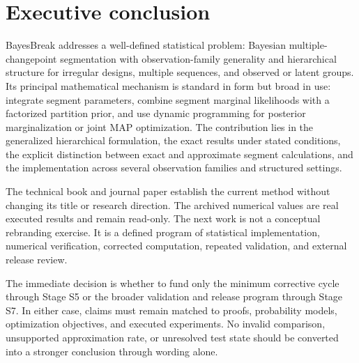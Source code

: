 \section{Executive conclusion}
\label{sec:exec-conclusion}

BayesBreak addresses a well-defined statistical problem: Bayesian multiple-changepoint segmentation with observation-family generality and hierarchical structure for irregular designs, multiple sequences, and observed or latent groups. Its principal mathematical mechanism is standard in form but broad in use: integrate segment parameters, combine segment marginal likelihoods with a factorized partition prior, and use dynamic programming for posterior marginalization or joint MAP optimization. The contribution lies in the generalized hierarchical formulation, the exact results under stated conditions, the explicit distinction between exact and approximate segment calculations, and the implementation across several observation families and structured settings.

The technical book and journal paper establish the current method without changing its title or research direction. The archived numerical values are real executed results and remain read-only. The next work is not a conceptual rebranding exercise. It is a defined program of statistical implementation, numerical verification, corrected computation, repeated validation, and external release review.

The immediate decision is whether to fund only the minimum corrective cycle through Stage S5 or the broader validation and release program through Stage S7. In either case, claims must remain matched to proofs, probability models, optimization objectives, and executed experiments. No invalid comparison, unsupported approximation rate, or unresolved test state should be converted into a stronger conclusion through wording alone.
